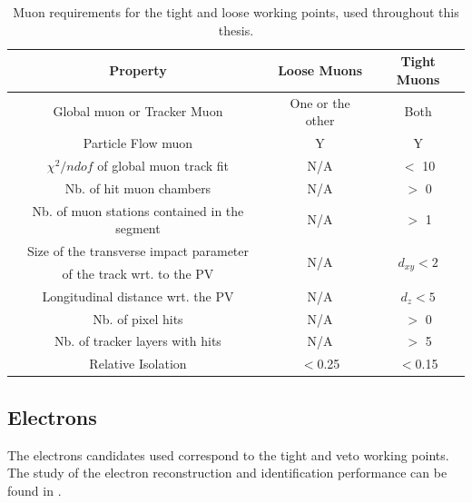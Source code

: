 \begin{table}[htbp]
	\centering
	\caption{Muon requirements for the tight and loose working points, used throughout this thesis.}
	\begin{tabular}{ccc}
		\toprule
		Property & Loose Muons & Tight Muons \\ 
		\midrule 
		Global muon or Tracker Muon & One or the other & Both \\ 
	
		Particle Flow muon & Y & Y \\ 
		
		$\chi^2/ndof$ of global muon track fit & N/A & $<$ 10 \\ 
	
		Nb. of hit muon chambers & N/A & $>$ 0 \\ 
		
		Nb. of muon stations contained in the segment & N/A & $>$ 1  \\ 
		
		 Size of the transverse impact parameter  & \multirow{2}{*}{N/A }& \multirow{2}{*}{$d_{xy} < 2$ \mm} \\ 
	 of the track wrt. to the PV & & \\
		Longitudinal distance wrt. the PV & N/A & $d_z < 5$ \mm \\ 
		
		Nb. of pixel hits & N/A & $>$ 0 \\ 
		
		Nb. of tracker layers with hits & N/A & $>$ 5 \\ 
	
		Relative Isolation & $<$0.25 & $<$0.15 \\
		\bottomrule
	\end{tabular} 
	
	\label{tab:MuonReq}
\end{table}



\subsection{Electrons}
\label{sec:ElectronID}
The electrons candidates used correspond to the tight and veto working points.  The study of the electron reconstruction and identification performance can be found in \cite{CMS-DP-2017-004}.

